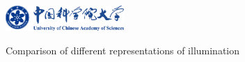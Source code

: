 \begin{figure}[!htbp]
    \centering
    \includegraphics[width=0.40\textwidth]{Img/ucas_logo.pdf}

    {Comparison of different representations of illumination}
    
    \label{fig:lighting-representation}
\end{figure}